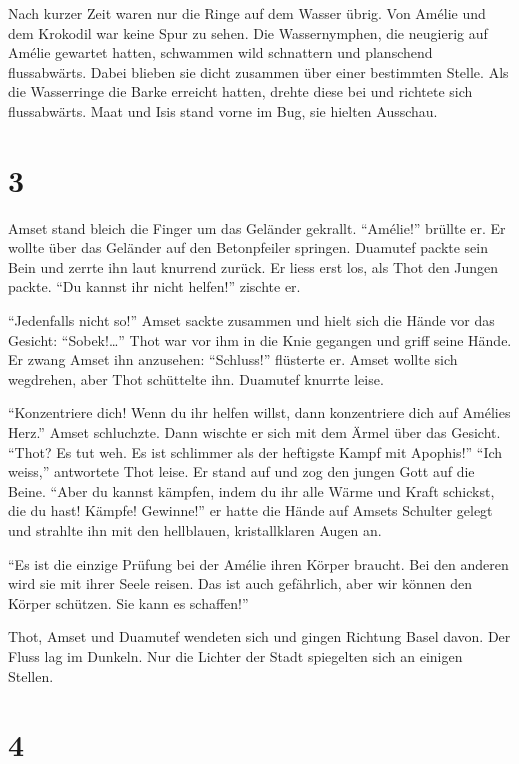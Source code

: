 \documentclass[11pt,titlepage,a5paper]{book}
\begin{document}
Nach kurzer Zeit waren nur die Ringe auf dem Wasser übrig. Von Amélie und dem Krokodil war keine Spur zu sehen. Die Wassernymphen, die neugierig auf Amélie gewartet hatten, schwammen wild schnattern und planschend flussabwärts. Dabei blieben sie dicht zusammen über einer bestimmten Stelle. Als die Wasserringe die Barke erreicht hatten, drehte diese bei und richtete sich flussabwärts. Maat und Isis stand vorne im Bug, sie hielten Ausschau.

\section*{3}

Amset stand bleich die Finger um das Geländer gekrallt. "`Amélie!"' brüllte er. Er wollte über das Geländer auf den Betonpfeiler springen. Duamutef packte sein Bein und zerrte ihn laut knurrend zurück. Er liess erst los, als Thot den Jungen packte. "`Du kannst ihr nicht helfen!"' zischte er.

"`Jedenfalls nicht so!"' Amset sackte zusammen und hielt sich die Hände vor das Gesicht: "`Sobek!\dots"' Thot war vor ihm in die Knie gegangen und griff seine Hände. Er zwang Amset ihn anzusehen: "`Schluss!"' flüsterte er. Amset wollte sich wegdrehen, aber Thot schüttelte ihn. Duamutef knurrte leise.

"`Konzentriere dich! Wenn du ihr helfen willst, dann konzentriere dich auf Amélies Herz."' Amset schluchzte. Dann wischte er sich mit dem Ärmel über das Gesicht. "`Thot? Es tut weh. Es ist schlimmer als der heftigste Kampf mit Apophis!"' "`Ich weiss,"' antwortete Thot leise. Er stand auf und zog den jungen Gott auf die Beine. "`Aber du kannst kämpfen, indem du ihr alle Wärme und Kraft schickst, die du hast! Kämpfe! Gewinne!"' er hatte die Hände auf Amsets Schulter gelegt und strahlte ihn mit den hellblauen, kristallklaren Augen an.

"`Es ist die einzige Prüfung bei der Amélie ihren Körper braucht. Bei den anderen wird sie mit ihrer Seele reisen. Das ist auch gefährlich, aber wir können den Körper schützen. Sie kann es schaffen!"'

Thot, Amset und Duamutef wendeten sich und gingen Richtung Basel davon. Der Fluss lag im Dunkeln. Nur die Lichter der Stadt spiegelten sich an einigen Stellen.

\section*{4}
\end{document}
